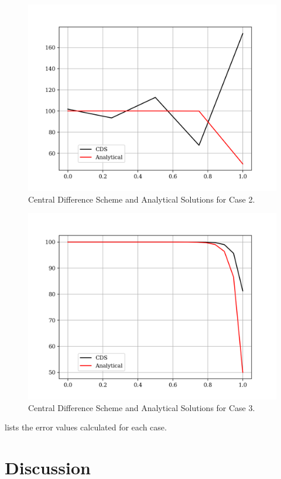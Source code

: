 \documentclass[12pt]{article}
\begin{document}
    
    \begin{figure}[htbp]
        \centering
        \includegraphics[width=\textwidth]{plots/graph_case2.png}
        \caption{Central Difference Scheme and Analytical Solutions for Case 2.}
        \label{fig:case2}
    \end{figure}

    
    \begin{figure}[htbp]
        \centering
        \includegraphics[width=\textwidth]{plots/graph_case3.png}
        \caption{Central Difference Scheme and Analytical Solutions for Case 3.}
        \label{fig:case3}
    \end{figure}

    \clearpage
     lists the error values calculated for each case.
    

    

\section{Discussion}
\end{document}
